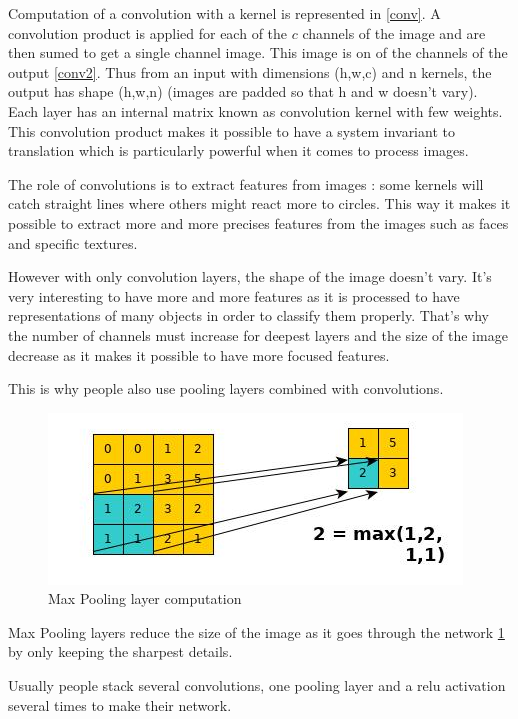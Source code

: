 \documentclass[11pt]{article}
\begin{document}
Computation of a convolution with a kernel is represented in \ref{conv}. A convolution product is applied for each of the $c$ channels of the image and are then sumed to get a single channel image. This image is on of the channels of the output \ref{conv2}. Thus from an input with dimensions (h,w,c) and n kernels, the output has shape (h,w,n) (images are padded so that h and w doesn't vary).
Each layer has an internal matrix known as convolution kernel with few weights. This convolution product makes it possible to have a system invariant to translation which is particularly powerful when it comes to process images. 

The role of convolutions is to extract features from images : some kernels will catch straight lines where others might react more to circles. This way it makes it possible to extract more and more precises features from the images such as faces and specific textures.

However with only convolution layers, the shape of the image doesn't vary. It's very interesting to have more and more features as it is processed to have representations of many objects in order to classify them properly. That's why the number of channels must increase for deepest layers and the size of the image decrease as it makes it possible to have more focused features.

This is why people also use pooling layers combined with convolutions.

\begin{figure}[!h]
\centering
\includegraphics[scale=0.40]{pool.jpg}
\caption{Max Pooling layer computation}
\label{pool}
\end{figure}

Max Pooling layers reduce the size of the image as it goes through the network \ref{pool} by only keeping the sharpest details.

Usually people stack several convolutions, one pooling layer and a relu activation several times to make their network.
\end{document}
